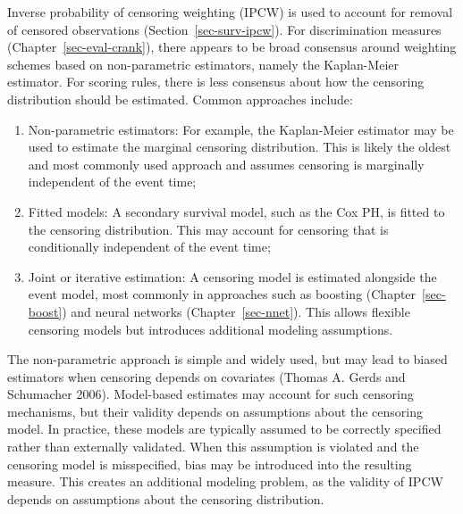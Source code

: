 \documentclass[
  letterpaper,
  krantz2]{style/krantz}
\providecommand{\tightlist}{%
  \setlength{\itemsep}{0pt}\setlength{\parskip}{0pt}}
\begin{document}
\begin{tcolorbox}[enhanced jigsaw, toprule=.15mm, bottomtitle=1mm, opacityback=0, breakable, leftrule=.75mm, title={Box 3 (Estimating censoring distributions for IPCW)}, toptitle=1mm, bottomrule=.15mm, colback=white, colframe=quarto-callout-note-color-frame, titlerule=0mm, opacitybacktitle=0.6, coltitle=black, rightrule=.15mm, left=2mm, colbacktitle=quarto-callout-note-color!10!white, arc=.35mm]

Inverse probability of censoring weighting
(IPCW) is used to
account for removal of censored observations
(Section~\ref{sec-surv-ipcw}). For discrimination measures
(Chapter~\ref{sec-eval-crank}), there appears to be broad consensus
around weighting schemes based on non-parametric estimators, namely the
Kaplan-Meier estimator. For scoring rules,
there is less consensus about how the censoring distribution should be
estimated. Common approaches include:

\begin{enumerate}
\def\labelenumi{\arabic{enumi}.}
\tightlist
\item
  Non-parametric estimators: For example, the Kaplan-Meier estimator may
  be used to estimate the marginal censoring distribution. This is
  likely the oldest and most commonly used approach and assumes
  censoring is marginally independent of the event time;
\item
  Fitted models: A secondary survival model, such as the Cox PH, is
  fitted to the censoring distribution. This may account for censoring
  that is conditionally independent of the event time;
\item
  Joint or iterative estimation: A censoring model is estimated
  alongside the event model, most commonly in approaches such as
  boosting (Chapter~\ref{sec-boost})
  and neural networks (Chapter~\ref{sec-nnet}).
  This allows flexible censoring models but introduces additional
  modeling assumptions.
\end{enumerate}

The non-parametric approach is simple and widely used, but may lead to
biased estimators when censoring depends on covariates (Thomas A. Gerds
and Schumacher 2006). Model-based estimates may account for such
censoring mechanisms, but their validity depends on assumptions about
the censoring model. In practice, these models are typically assumed to
be correctly specified rather than externally validated. When this
assumption is violated and the censoring model is misspecified, bias may
be introduced into the resulting measure. This creates an additional
modeling problem, as the validity of IPCW depends on assumptions about
the censoring distribution.


\end{tcolorbox}
\end{document}
